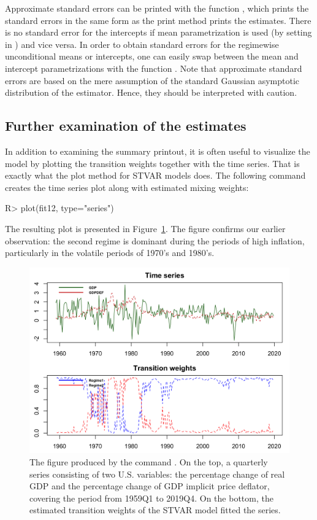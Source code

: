 \documentclass[nojss]{jss}
\begin{document}
Approximate standard errors can be printed with the function , which prints the standard errors in the same form as the print method prints the estimates. There is no standard error for the intercepts if mean parametrization is used (by setting  in ) and vice versa. In order to obtain standard errors for the regimewise unconditional means or intercepts, one can easily swap between the mean and intercept parametrizations with the function . Note that approximate standard errors are based on the mere assumption of the standard Gaussian asymptotic distribution of the estimator. Hence, they should be interpreted with caution.

\subsection{Further examination of the estimates}\label{sec:examestim}
In addition to examining the summary printout, it is often useful to visualize the model by plotting the transition weights together with the time series. That is exactly what the plot method for STVAR models does. The following command creates the time series plot along with estimated mixing weights:
%
\begin{CodeChunk}
\begin{CodeInput}
R> plot(fit12, type="series")
\end{CodeInput}
\end{CodeChunk}
%
The resulting plot is presented in Figure~\ref{fig:seriesplot}. The figure confirms our earlier observation: the second regime is dominant during the periods of high inflation, particularly in the volatile periods of 1970's and 1980's.

\begin{figure}[t]
  \centering
  \includegraphics{figures/seriesplot.png}
  \caption{The figure produced by the command . On the top, a quarterly series consisting of two U.S. variables: the percentage change of real GDP and the percentage change of GDP implicit price deflator, covering the period from 1959Q1 to 2019Q4. On the bottom, the estimated transition weights of the STVAR model  fitted the series.}
\label{fig:seriesplot}\end{figure}
\end{document}
